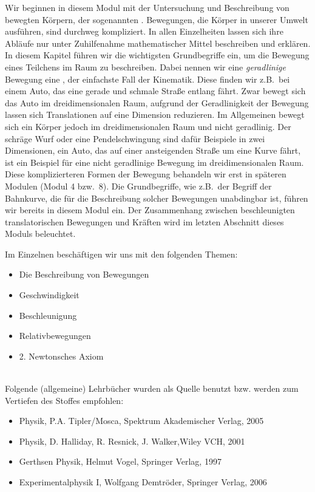 




\MSetSubject{\MINTPhysics}


\begin{MSectionStart}


Wir beginnen in diesem Modul mit der Untersuchung und Beschreibung von bewegten K\"orpern, der sogenannten . Bewegungen, die K\"orper in unserer Umwelt ausf\"uhren, sind durchweg kompliziert. In allen Einzelheiten lassen sich ihre Abl\"aufe nur unter Zuhilfenahme mathematischer Mittel beschreiben und erkl\"aren. In diesem Kapitel f\"uhren wir die wichtigsten Grundbegriffe ein, um die Bewegung eines Teilchens im Raum zu beschreiben. Dabei nennen wir eine \textit{geradlinige} Bewegung eine , der einfachste Fall der Kinematik. Diese finden wir z.B.~bei einem Auto, das eine gerade und schmale Stra{\ss}e entlang f\"ahrt. Zwar bewegt sich das Auto im dreidimensionalen Raum, aufgrund der Geradlinigkeit der Bewegung lassen sich Translationen auf eine Dimension reduzieren. Im Allgemeinen bewegt sich ein K\"orper jedoch im dreidimensionalen Raum und nicht geradlinig. Der schr\"age Wurf oder eine Pendelschwingung sind daf\"ur Beispiele in zwei Dimensionen, ein Auto, das auf einer ansteigenden Stra{\ss}e um eine Kurve f\"ahrt, ist ein Beispiel f\"ur eine nicht geradlinige Bewegung im dreidimensionalen Raum. Diese komplizierteren Formen der Bewegung behandeln wir erst in sp\"ateren Modulen (Modul 4 bzw.~8). Die Grundbegriffe, wie z.B.~der Begriff der Bahnkurve, die f\"ur die Beschreibung solcher Bewegungen unabdingbar ist, f\"uhren wir bereits in diesem Modul ein. Der Zusammenhang zwischen beschleunigten translatorischen Bewegungen und Kr\"aften wird im letzten Abschnitt dieses Moduls beleuchtet.



 Im Einzelnen besch\"aftigen wir uns mit den folgenden Themen:
  
\begin{itemize}
\item Die Beschreibung von Bewegungen
\item Geschwindigkeit
\item Beschleunigung
\item Relativbewegungen
\item 2. Newtonsches Axiom
\end{itemize}
\ \\[0.5cm]
Folgende (allgemeine) Lehrb\"ucher wurden als Quelle benutzt bzw. werden zum Vertiefen des Stoffes empfohlen:  
\begin{itemize} 
\item Physik, P.A. Tipler/Mosca, Spektrum Akademischer Verlag, 2005
\item Physik, D. Halliday, R. Resnick, J. Walker,Wiley VCH, 2001
\item Gerthsen Physik, Helmut Vogel, Springer Verlag, 1997
\item Experimentalphysik I, Wolfgang Demtr\"oder, Springer Verlag, 2006
\end{itemize}

\end{MSectionStart}


